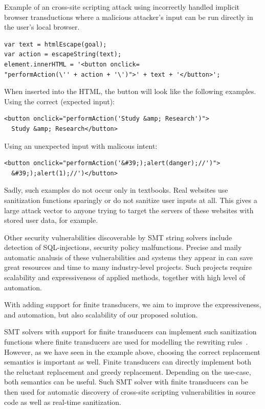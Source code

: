 \begin{listing}[!ht]
\caption{Example of an cross-site scripting attack using incorrectly handled implicit browser transductions where a malicious attacker's input can be run directly in the user's local browser.}
\label{listing:not_sanitized_implicit_browser_transductions_example}

    \begin{verbatim}
var text = htmlEscape(goal);
var action = escapeString(text);
element.innerHTML = '<button onclick=
"performAction(\'' + action + '\')">' + text + '</button>';
    \end{verbatim}

    When inserted into the HTML, the button will look like the following examples.
    Using the correct (expected input):
    \begin{verbatim}
<button onclick="performAction('Study &amp; Research')">
  Study &amp; Research</button>
    \end{verbatim}

    Using an unexpected input with malicous intent:

    \begin{verbatim}
<button onclick="performAction('&#39;);alert(danger);//')">
  &#39;);alert(1);//')</button>
    \end{verbatim}
\end{listing}

Sadly, such examples do not occur only in textbooks. Real websites use sanitization functions sparingly or do not sanitize user inputs at all.
This gives a large attack vector to anyone trying to target the servers of these websites with stored user data, for example.

Other security vulnerabilities discoverable by SMT string solvers include detection of SQL-injections, security policy malfunctions.
Precise and maily automatic analusis of these vulnerabilities and systems they appear in can save great resources and time to many industry-level projects.
Such projects require scalability and expressiveness of applied methods, together with high level of automation.

With adding support for finite transducers, we aim to improve the expressiveness, and automation, but also scalability of our proposed solution.

SMT solvers with support for finite transducers can implement such sanitization functions where finite transducers are used for modelling the rewriting rules~\cite{rewriting_rules_kaplan94, rewriting_rules_karttunen97}.
However, as we have seen in the example above, choosing the correct replacement semantics is important as well.
Finite transducers can directly implement both the reluctant replacement and greedy replacement.
Depending on the use-case, both semantics can be useful.
Such SMT solver with finite transducers can be then used for automatic discovery of cross-site scripting vulnerabilities in source code as well as real-time sanitization.


